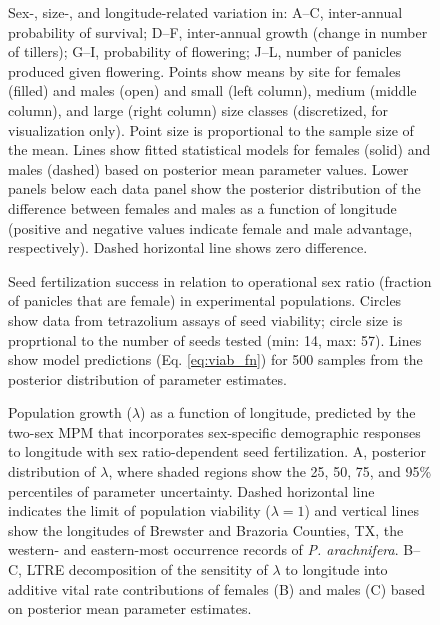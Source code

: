 \documentclass[11pt]{article}\usepackage[]{graphicx}\usepackage[]{color}
\newcommand{\revise}[1]{{\color{Black}{#1}}}
\begin{document}
\begin{figure}
	\begin{center}
		\caption{Sex-, size-, and longitude-related variation in:  A--C, inter-annual probability of survival; D--F, inter-annual growth (change in number of tillers); G--I, probability of flowering; J--L, number of panicles produced given flowering. 
			Points show means by site for females (filled) and males (open) and small (left column), medium (middle column), and large (right column) size classes (discretized, for visualization only).
			Point size is proportional to the sample size of the mean.
			Lines show fitted statistical models for females (solid) and males (dashed) based on posterior mean parameter values.
			Lower panels below each data panel show the posterior distribution of the difference between females and males as a function of longitude (positive and negative values indicate female and male advantage, respectively).
			\revise{Shaded contours show the 25, 50, 75, and 95 percentiles of the posterior distribution.}
			Dashed horizontal line shows zero difference.}
		\label{fig:vital_rates}
	\end{center}
\end{figure}


\begin{figure}
	\begin{center}
		\caption{Seed fertilization success in relation to operational sex ratio (fraction of panicles that are female) in experimental populations. 
			Circles show data from tetrazolium assays of seed viability; circle size is proprtional to the number of seeds tested (min: 14, max: 57).
			Lines show model predictions (Eq. \ref{eq:viab_fn}) for 500 samples from the posterior distribution of parameter estimates.}
		\label{fig:seed_viability}
	\end{center}
\end{figure}

\begin{figure}
	\begin{center}
		\caption{Population growth ($\lambda$) as a function of longitude, predicted by the two-sex MPM that incorporates sex-specific demographic responses to longitude with sex ratio-dependent seed fertilization. 
			A, posterior distribution of $\lambda$, where shaded regions show the 25, 50, 75, and 95\% percentiles of parameter uncertainty. 
			Dashed horizontal line indicates the limit of population viability ($\lambda=1$) and vertical lines show the longitudes of Brewster and Brazoria Counties, TX, the western- and eastern-most occurrence records of \textit{P. arachnifera}.
			B--C, LTRE decomposition of the sensitity of $\lambda$ to longitude into additive vital rate contributions of females (B) and males (C) based on posterior mean parameter estimates. }
		\label{fig:lambda_long}
	\end{center}
\end{figure}
\end{document}
